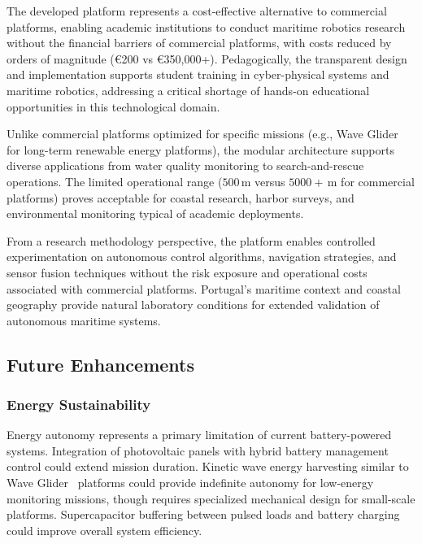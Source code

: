 \documentclass[conference]{IEEEtran}
\begin{document}
The developed platform represents a cost-effective alternative to commercial platforms, enabling academic institutions to conduct maritime robotics research without the financial barriers of commercial platforms, with costs reduced by orders of magnitude (€200 vs €350,000+). Pedagogically, the transparent design and implementation supports student training in cyber-physical systems and maritime robotics, addressing a critical shortage of hands-on educational opportunities in this technological domain.

Unlike commercial platforms optimized for specific missions (e.g., Wave Glider~\cite{wave-glider} for long-term renewable energy platforms), the modular architecture supports diverse applications from water quality monitoring to search-and-rescue operations. The limited operational range ($500 \, \mathrm{m}$ versus $5000+ \, \mathrm{m}$ for commercial platforms) proves acceptable for coastal research, harbor surveys, and environmental monitoring typical of academic deployments.

From a research methodology perspective, the platform enables controlled experimentation on autonomous control algorithms, navigation strategies, and sensor fusion techniques without the risk exposure and operational costs associated with commercial platforms. Portugal's maritime context and coastal geography provide natural laboratory conditions for extended validation of autonomous maritime systems.

\subsection{Future Enhancements}
\subsubsection{Energy Sustainability}
Energy autonomy represents a primary limitation of current battery-powered systems. Integration of photovoltaic panels with hybrid battery management control could extend mission duration. Kinetic wave energy harvesting similar to Wave Glider~\cite{wave-glider} platforms could provide indefinite autonomy for low-energy monitoring missions, though requires specialized mechanical design for small-scale platforms. Supercapacitor buffering between pulsed loads and battery charging could improve overall system efficiency.
\end{document}
